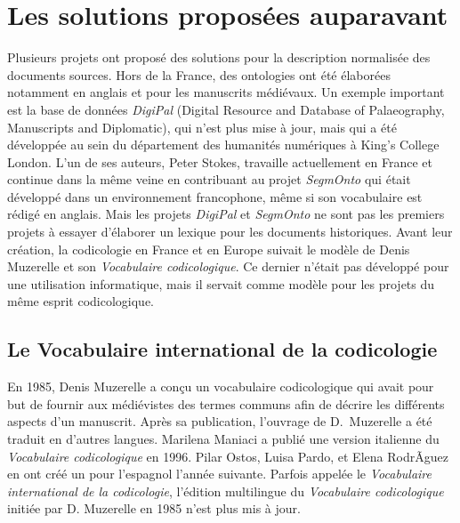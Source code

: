 \documentclass[class=article, crop=false]{standalone}
\begin{document}
\section{Les solutions proposées auparavant}

Plusieurs projets ont proposé des solutions pour la description normalisée des documents sources. Hors de la France, des ontologies ont été élaborées notamment en anglais et pour les manuscrits médiévaux. Un exemple important est la base de données \textit{DigiPal} (Digital Resource and Database of Palaeography, Manuscripts and Diplomatic), qui n'est plus mise à jour, mais qui a été développée au sein du département des humanités numériques à King's College London.\autocite{DigiPalDigitalResource2011} L'un de ses auteurs, Peter Stokes, travaille actuellement en France et continue dans la même veine en contribuant au projet \textit{SegmOnto} qui était développé dans un environnement francophone, même si son vocabulaire est rédigé en anglais\autocite{gabaySegmOnto2021}. Mais les projets \textit{DigiPal} et \textit{SegmOnto} ne sont pas les premiers projets à essayer d'élaborer un lexique pour les documents historiques. Avant leur création, la codicologie en France et en Europe suivait le modèle de Denis Muzerelle et son \textit{Vocabulaire codicologique}. Ce dernier n'était pas développé pour une utilisation informatique, mais il servait comme modèle pour les projets du même esprit codicologique.

\subsection{Le Vocabulaire international de la codicologie}

En 1985, Denis Muzerelle a conçu un vocabulaire codicologique qui avait pour but de fournir aux médiévistes  des termes communs afin de décrire les différents aspects d'un manuscrit\autocite{muzerelleVocabulaireCodicologiqueRepertoire1985}. Après sa publication, l'ouvrage de D.~Muzerelle a été traduit en d'autres langues. Marilena Maniaci a publié une version italienne du \textit{Vocabulaire codicologique} en 1996\autocite{maniaciTerminologiaLibroManoscritto1996}. Pilar Ostos, Luisa Pardo, et Elena RodrÃguez en ont créé un pour l'espagnol l'année suivante\autocite{ostosVocabularioCodicologIaVersion1997}. Parfois appelée le \textit{Vocabulaire international de la codicologie}, l'édition multilingue du \textit{Vocabulaire codicologique} initiée par D. Muzerelle en 1985 n'est plus mis à jour.
\end{document}
